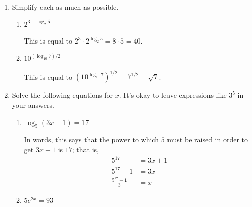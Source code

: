 \documentclass{article}
\theoremstyle{theorem}
\begin{document}
\begin{enumerate}[resume]
\item 

  Simplify each as much as possible.

  \begin{enumerate}

  \item
    \begin{problem}
      $2^{3 + \log_2 5}$
    \end{problem}

    \begin{solution}
      This is equal to $2^3 \cdot 2^{\log_2 5} = 8 \cdot 5 = \boxed{40}$.
    \end{solution}

  \item
    \begin{problem}
      $10^{(\log_{10} 7) / 2}$
    \end{problem}

    \begin{solution}
      This is equal to $\left( 10^{\log_{10} 7} \right)^{1/2} = 7^{1/2} =
      \boxed{\sqrt{7}}$.
    \end{solution}
  \end{enumerate}

\item Solve the following equations for $x$. It's okay to leave expressions like $3^5$ in your answers. 

  \begin{enumerate}

  \item 
    \begin{problem}
      $\log_5 (3x + 1) = 17$
    \end{problem}

    \begin{solution}
      In words, this says that the power to which $5$ must be raised in order to get $3x + 1$ is $17$; that is,
      \begin{align*}
        5^{17} &= 3x + 1 \\
        5^{17} - 1 &= 3x \\
        \boxed{\frac{5^{17} - 1}{3}} &= x
      \end{align*}
    \end{solution}

  \item 
    \begin{problem}
      $5 e^{2x} = 93$
    \end{problem}


\end{enumerate}
\end{enumerate}
\end{document}
